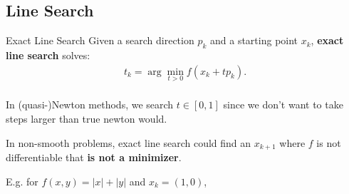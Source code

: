\documentclass{beamer}
\begin{document}
\subsection{Line Search}
\begin{frame}{Exact Line Search}
    Given a search direction $p_k$ and a starting point $x_k$,
    \textbf{exact line search} solves:
    \begin{align*}
        t_k = \arg \min_{t > 0} f(x_k + t p_k).
    \end{align*}
    \\

     {
        \vspace{0.5em}
        In (quasi-)Newton methods, we search $t \in [0, 1]$
        since we don't want to take steps larger
        than true newton would.
    }
     {
        In non-smooth problems, exact line search could
        find an $x_{k + 1}$ where $f$ is not differentiable
        that \textbf{is not a minimizer}.
        \\
        \vspace{0.5em}

        E.g. for $f(x, y) = |x| + |y|$ and $x_k = (1, 0)$,
    }
\end{frame}
\end{document}
